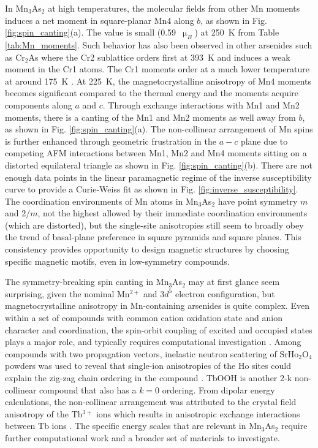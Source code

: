 \documentclass[10pt,doublespacing,edeposit]{uiucthesis2020}
\begin{document}
\begin{mainmatter}
In Mn$_3$As$_2$ at high temperatures, the molecular fields from other Mn moments induces a net moment in square-planar Mn4 along $b$, as shown in Fig. \ref{fig:spin_canting}(a). The value is small (0.59~$\upmu_B$) at 250~K from Table \ref{tab:Mn_moments}. Such behavior has also been observed in other arsenides such as Cr$_2$As where the Cr2 sublattice orders first at 393~K and induces a weak moment in the Cr1 atoms. The Cr1 moments order at a much lower temperature at around 175~K \cite{Ishimoto1995}.
At 225~K, the magnetocrystalline anisotropy of Mn4 moments becomes significant compared to the thermal energy and the moments acquire components along $a$ and $c$. Through exchange interactions with Mn1 and Mn2 moments, there is a canting of the Mn1 and Mn2 moments as well away from $b$, as shown in Fig. \ref{fig:spin_canting}(a). The non-collinear arrangement of Mn spins is further enhanced through geometric frustration in the $a-c$ plane due to competing AFM interactions between Mn1, Mn2 and Mn4 moments sitting on a distorted equilateral triangle as shown in Fig. \ref{fig:spin_canting}(b). There are not enough data points in the linear paramagnetic regime of the inverse susceptibility curve to provide a Curie-Weiss fit as shown in Fig. \ref{fig:inverse_susceptibility}.
The coordination environments of Mn atoms in Mn$_3$As$_2$ have point symmetry $m$ and $2/m$, not the highest allowed by their immediate coordination environments (which are distorted), but the single-site anisotropies still seem to broadly obey the trend of basal-plane preference in square pyramids and square planes.  This consistency provides opportunity to design magnetic structures by choosing specific magnetic motifs, even in low-symmetry compounds. 

The symmetry-breaking spin canting in Mn$_3$As$_2$ may at first glance seem surprising, given the nominal Mn$^{2+}$ and $3d^5$ electron configuration, but magnetocrystalline anisotropy in Mn-containing arsenides is  quite complex. Even within a set of compounds with common cation oxidation state and anion character and coordination, the spin-orbit coupling of excited and occupied states plays a major role, and typically requires computational investigation \cite{Duboc2016}.
Among compounds with two propagation vectors, inelastic neutron scattering of SrHo$_2$O$_4$ powders was used to reveal that single-ion anisotropies of the Ho sites could explain the zig-zag chain ordering in the compound \cite{Fennell2014}. TbOOH is another 2-k non-collinear compound that also has a $k = 0$ ordering. From dipolar energy calculations, the non-collinear arrangement was attributed to the crystal field anisotropy of the Tb$^{3+}$ ions which results in anisotropic exchange interactions between Tb ions \cite{Christensen1974}.
The specific energy scales that are relevant in Mn$_3$As$_2$ require further computational work and a broader set of materials to investigate. 


\end{mainmatter}
\end{document}
